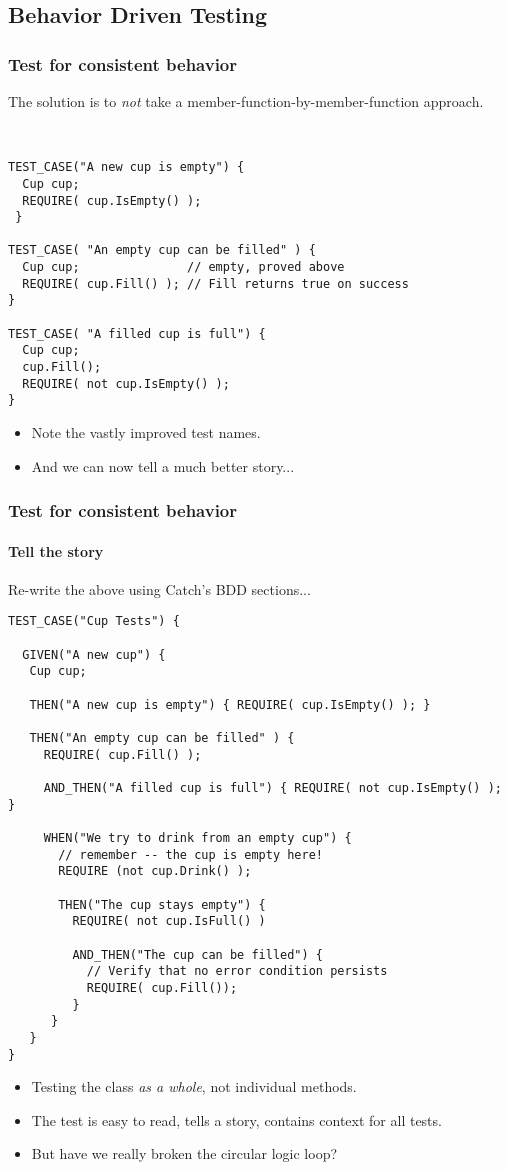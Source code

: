 \subsection{Behavior Driven Testing}
\begin{frame}[fragile,t]
\frametitle{Test for consistent behavior}
The solution is to \emph{not} take a
member-function-by-member-function approach.  
{\scriptsize\
\begin{verbatim}
TEST_CASE("A new cup is empty") {
  Cup cup;
  REQUIRE( cup.IsEmpty() ); 
 }                                     

TEST_CASE( "An empty cup can be filled" ) {
  Cup cup;               // empty, proved above
  REQUIRE( cup.Fill() ); // Fill returns true on success
}

TEST_CASE( "A filled cup is full") {
  Cup cup;
  cup.Fill();
  REQUIRE( not cup.IsEmpty() );
}  
\end{verbatim}}

\begin{itemize}
\item Note the vastly improved test names.
\item And we can now tell a much better story...
\end{itemize}
\end{frame}

\begin{frame}[fragile,t]
\frametitle{Test for consistent behavior}
\framesubtitle{Tell the story}
Re-write the above using Catch's BDD sections...
{\tiny \begin{verbatim}
TEST_CASE("Cup Tests") {

  GIVEN("A new cup") {
   Cup cup;

   THEN("A new cup is empty") { REQUIRE( cup.IsEmpty() ); }

   THEN("An empty cup can be filled" ) {
     REQUIRE( cup.Fill() );

     AND_THEN("A filled cup is full") { REQUIRE( not cup.IsEmpty() ); }

     WHEN("We try to drink from an empty cup") {
       // remember -- the cup is empty here!
       REQUIRE (not cup.Drink() );

       THEN("The cup stays empty") {
         REQUIRE( not cup.IsFull() )

         AND_THEN("The cup can be filled") {
           // Verify that no error condition persists
           REQUIRE( cup.Fill());
         }
      }
   }
}  
\end{verbatim}
}
\begin{itemize}
\item Testing the class \emph{as a whole}, not individual methods.
\item The test is easy to read, tells a story, contains context for
  all tests.
\item But have we really broken the circular logic loop?
\end{itemize}
\end{frame}


